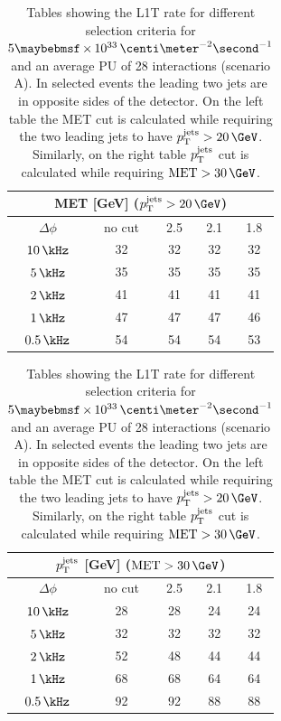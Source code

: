 \begin{table}[!htb]
\begin{minipage}{.5\linewidth}
  \centering
  \begin{tabular}{|c||c|c|c|c|}
  \hline
  \multicolumn{5}{|c|}{MET [GeV] ($\pt^{\text{jets}} > 20\,\GeV$)} \\
  \hline\hline
  $\Delta\phi$ & no cut & 2.5 & 2.1 & 1.8 \\
  \hline
   $10\,\kHz$  &     32 &  32 &  32 &  32 \\
    $5\,\kHz$  &     35 &  35 &  35 &  35 \\
  \hline\hline
    $2\,\kHz$  &     41 &  41 &  41 &  41 \\
  \hline\hline
    $1\,\kHz$  &     47 &  47 &  47 &  46 \\
  $0.5\,\kHz$  &     54 &  54 &  54 &  53 \\
  \hline
  \end{tabular}
\end{minipage}%
\begin{minipage}{.5\linewidth}
  \centering
  \begin{tabular}{|c||c|c|c|c|}
  \hline
  \multicolumn{5}{|c|}{$p_{\mathrm{T}}^{\text{jets}}$ [GeV] ($\text{MET}>30\,\GeV$)} \\
  \hline
  $\Delta\phi$ & no cut & 2.5 & 2.1 & 1.8 \\
  \hline\hline
   $10\,\kHz$  &     28 &  28 &  24 &  24 \\
    $5\,\kHz$  &     32 &  32 &  32 &  32 \\
  \hline\hline
    $2\,\kHz$  &     52 &  48 &  44 &  44 \\
  \hline\hline
    $1\,\kHz$  &     68 &  68 &  64 &  64 \\
  $0.5\,\kHz$  &     92 &  92 &  88 &  88 \\
  \hline
  \end{tabular}
\end{minipage} 
\caption[Tables showing the L1T rate for different selection criteria for $5 \times 10^{33}\,\centi\meter^{-2}\second^{-1}$ and an average PU of 28 interactions (scenario A).]
{Tables showing the \gls{L1T} rate for different selection criteria for $5 \times 10^{33}\,\centi\meter^{-2}\second^{-1}$ and an average \gls{PU} of 28 interactions (scenario A). In selected events the leading two jets are in opposite sides of the detector. On the left table the \gls{MET} cut is calculated while requiring the two leading jets to have $\pt^{\text{jets}} > 20\,\GeV$. Similarly, on the right table $p_{\mathrm{T}}^{\text{jets}}$ cut is calculated while requiring $\text{MET}>30\,\GeV$.}
\label{TABLE:ParkedDataAnalysis_L1TParkedTriggerDevelopment_Rate5E33}
\end{table}

